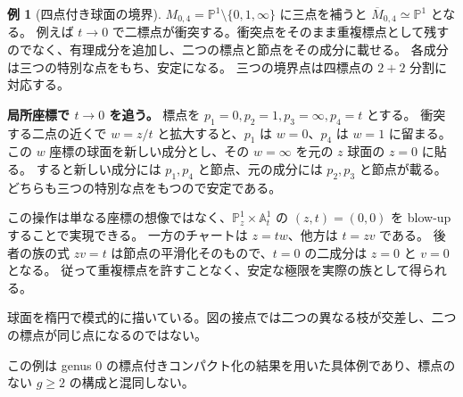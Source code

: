 \documentclass[dvipdfmx,a4paper,11pt]{article}
\theoremstyle{definition}
\newtheorem{exa}[thm]{例}
\newcommand{\PP}{\mathbb P}\newcommand{\HH}{\mathbb H}
\newcommand{\A}{\mathbb A}
\begin{document}
\begin{exa}[四点付き球面の境界]
$M_{0,4}=\PP^1\setminus\{0,1,\infty\}$ に三点を補うと $\overline M_{0,4}\simeq\PP^1$ となる。
例えば $t\to0$ で二標点が衝突する。衝突点をそのまま重複標点として残すのでなく、有理成分を追加し、二つの標点と節点をその成分に載せる。
各成分は三つの特別な点をもち、安定になる。
三つの境界点は四標点の $2+2$ 分割に対応する。

\textbf{局所座標で $t\to0$ を追う。}
標点を $p_1=0,p_2=1,p_3=\infty,p_4=t$ とする。
衝突する二点の近くで $w=z/t$ と拡大すると、$p_1$ は $w=0$、$p_4$ は $w=1$ に留まる。
この $w$ 座標の球面を新しい成分とし、その $w=\infty$ を元の $z$ 球面の $z=0$ に貼る。
すると新しい成分には $p_1,p_4$ と節点、元の成分には $p_2,p_3$ と節点が載る。
どちらも三つの特別な点をもつので安定である。

この操作は単なる座標の想像ではなく、$\PP^1_z\times\A^1_t$ の $(z,t)=(0,0)$ を blow-up することで実現できる。
一方のチャートは $z=tw$、他方は $t=zv$ である。
後者の族の式 $zv=t$ は節点の平滑化そのもので、$t=0$ の二成分は $z=0$ と $v=0$ となる。
従って重複標点を許すことなく、安定な極限を実際の族として得られる。
\end{exa}
\par\medskip
\noindent\begin{minipage}{\linewidth}
\begin{center}
\end{center}
球面を楕円で模式的に描いている。図の接点では二つの異なる枝が交差し、二つの標点が同じ点になるのではない。
\end{minipage}\par\medskip

この例は genus $0$ の標点付きコンパクト化の結果を用いた具体例であり、標点のない $g\ge2$ の構成と混同しない。
\end{document}

